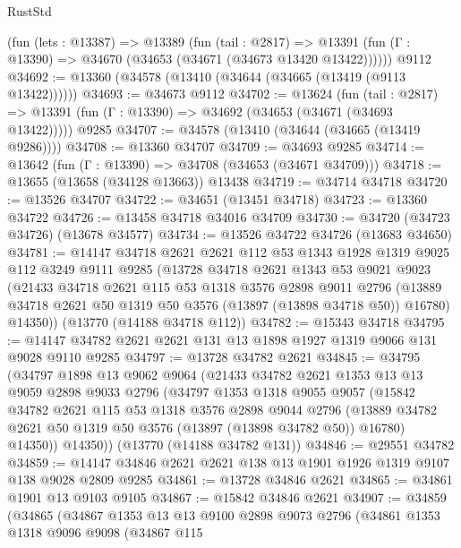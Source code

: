 \begin{lexlean}{RustStd}
\begin{coremodule}
    (fun (lets : @13387) =>
    @13389
      (fun (tail : @2817) =>
      @13391 (fun (Γ : @13390) => @34670 (@34653 (@34671 (@34673 @13420 @13422))))))
    @9112
@34692 := @13360 (@34578 (@13410 (@34644 (@34665 (@13419 (@9113 @13422))))))
@34693 := @34673 @9112
@34702 := @13624
    (fun (tail : @2817) => @13391 (fun (Γ : @13390) => @34692 (@34653 (@34671 (@34693 @13422)))))
    @9285
@34707 := @34578 (@13410 (@34644 (@34665 (@13419 @9286))))
@34708 := @13360 @34707
@34709 := @34693 @9285
@34714 := @13642 (fun (Γ : @13390) => @34708 (@34653 (@34671 @34709)))
@34718 := @13655 (@13658 (@34128 @13663)) @13438
@34719 := @34714 @34718
@34720 := @13526 @34707
@34722 := @34651 (@13451 @34718)
@34723 := @13360 @34722
@34726 := @13458 @34718 @34016 @34709
@34730 := @34720 (@34723 @34726) (@13678 @34577)
@34734 := @13526 @34722 @34726 (@13683 @34650)
@34781 := @14147
    @34718
    @2621
    @2621
    @112
    @53
    @1343
    @1928
    @1319
    @9025
    @112
    @3249
    @9111
    @9285
    (@13728
      @34718
      @2621
      @1343
      @53
      @9021
      @9023
      (@21433
        @34718
        @2621
        @115
        @53
        @1318
        @3576
        @2898
        @9011
        @2796
        (@13889 @34718 @2621 @50 @1319 @50 @3576 (@13897 (@13898 @34718 @50)) @16780)
        @14350))
    (@13770 (@14188 @34718 @112))
@34782 := @15343 @34718
@34795 := @14147 @34782 @2621 @2621 @131 @13 @1898 @1927 @1319 @9066 @131 @9028 @9110 @9285
@34797 := @13728 @34782 @2621
@34845 := @34795
    (@34797
      @1898
      @13
      @9062
      @9064
      (@21433
        @34782
        @2621
        @1353
        @13
        @13
        @9059
        @2898
        @9033
        @2796
        (@34797
          @1353
          @1318
          @9055
          @9057
          (@15842
            @34782
            @2621
            @115
            @53
            @1318
            @3576
            @2898
            @9044
            @2796
            (@13889 @34782 @2621 @50 @1319 @50 @3576 (@13897 (@13898 @34782 @50)) @16780)
            @14350))
        @14350))
    (@13770 (@14188 @34782 @131))
@34846 := @29551 @34782
@34859 := @14147 @34846 @2621 @2621 @138 @13 @1901 @1926 @1319 @9107 @138 @9028 @2809 @9285
@34861 := @13728 @34846 @2621
@34865 := @34861 @1901 @13 @9103 @9105
@34867 := @15842 @34846 @2621
@34907 := @34859
    (@34865
      (@34867
        @1353
        @13
        @13
        @9100
        @2898
        @9073
        @2796
        (@34861
          @1353
          @1318
          @9096
          @9098
          (@34867
            @115

\end{coremodule}
\end{lexlean}
